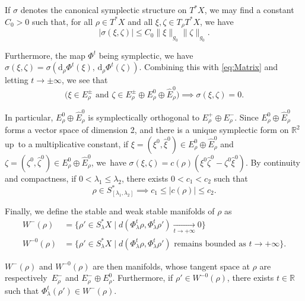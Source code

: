 \documentclass[JEP,XML,SOM,Unicode,published]{cedram}
\let\sep\mid
\newcommand{\sd}{\mathrm{d}}
\newcommand{\rd}{\,\mathrm{d}}
\theoremstyle{plain}
\theoremstyle{definition}
\newcommand{\R}{\mathbb{R}}
\begin{document}
If $\sigma$ denotes the canonical symplectic structure on $T^*X$, we may find a constant $C_0>0$ such that, for all $\rho\in T^*X$ and all $\xi, \zeta \in T_\rho T^*X$, we have
\begin{equation}\label{eq:CestRelouDeReprendreLePapier}
|\sigma(\xi, \zeta)| \leq C_0 \|\xi\|_{g_0} \|\zeta\|_{g_0}.
\end{equation}

Furthermore, the map $\Phi^t$ being symplectic, we have $\sigma(\xi, \zeta) = \sigma(\sd _\rho \Phi^t(\xi), \rd _\rho \Phi^t(\zeta))$. Combining this with \eqref{eq:Matrix} and letting $t\to \pm \infty$, we see that
\begin{equation}\label{eq:CestRelouDeReprendreLePapier2}
\bigl(\xi \in E_\rho^\pm \text{ and } \zeta \in E_\rho^\pm \oplus E_\rho^0 \oplus \hat{E}_\rho^0 \bigr) \implies \sigma(\xi, \zeta)=0.
\end{equation}

In particular, $E_\rho^0 \oplus \hat{E}_\rho^0$ is symplectically orthogonal to $E_\rho^+ \oplus E_\rho^-$. Since $E_\rho^0 \oplus \hat{E}_\rho^0$ forms a vector space of dimension 2, and there is a unique symplectic form on $\R^2$ up~to a multiplicative constant, if $\xi = (\xi^0, \hat{\xi}^0) \in E_\rho^0 \oplus \hat{E}_\rho^0$ and $\zeta = (\zeta^0, \hat{\zeta}^0) \in E_\rho^0 \oplus \hat{E}_\rho^0$, we~have $\sigma(\xi, \zeta) = c(\rho)(\xi^0 \hat{\zeta}^0 - \zeta^0 \hat{\xi}^0)$. By continuity and compactness, if $0<\lambda_1 \leq \lambda_2$, there exists $0< c_1<c_2$ such that
\begin{equation}\label{eq:CestRelouDeReprendreLePapier3}
\rho \in S^*_{[\lambda_1, \lambda_2]} \implies c_1 \leq |c(\rho)| \leq c_2.
\end{equation}

Finally, we define the stable and weak stable manifolds of $\rho$ as
\begin{align*}
W^{-}(\rho) &= \{ \rho'\in S_\lambda^*X \sep d (\Phi_\lambda^t \rho, \Phi_\lambda^t \rho') \underset{t\to +\infty}{\to} 0\}\\
W^{-0}(\rho) &= \{ \rho'\in S_\lambda^*X \sep d (\Phi_\lambda^t \rho, \Phi_\lambda^t \rho') \text{ remains bounded as } t\rightarrow +\infty\}.
\end{align*}

$W^{-}(\rho)$ and $W^{-0}(\rho)$ are then manifolds, whose tangent space at $\rho$ are respectively~$E_\rho^-$ and $E_\rho^- \oplus E^0_\rho$. Furthermore, if $\rho'\in W^{-0}(\rho)$, there exists $t\in \R$ such that $\Phi^t_\lambda(\rho') \in W^-(\rho)$.
\end{document}
